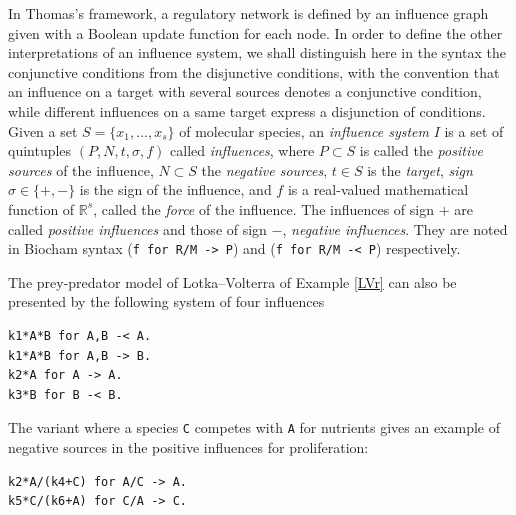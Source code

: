 \documentclass[graybox]{svmult}
\begin{document}
In Thomas's framework, a regulatory network is defined by an influence graph given with a Boolean update function for each node.
In order to define the other interpretations of an influence system, we shall distinguish here in the syntax
the conjunctive conditions from the disjunctive conditions,
with the convention that an influence on a target with several sources denotes a conjunctive condition,
while different influences on a same target express a disjunction of conditions. %
   Given a set $S = \{x_1,\dots,x_s\}$ of molecular species, an \emph{influence system}
   $I$ is a set of quintuples $(P, N, t, \sigma, f)$ called \emph{influences}, 
   where $P\subset S$ is called the \emph{positive sources} of the influence, $N\subset S$ the \emph{negative sources}, $t\in S$ is the \emph{target}, 
   \emph{sign} $\sigma\in\{+,-\}$ is the sign of the influence, and $f$ is a real-valued mathematical function
   of $\mathbb{R}^s$, called the \emph{force} of the influence.
The influences of sign $+$ are called \emph{positive influences} and those of
sign $-$, \emph{negative influences}. They are noted in Biocham syntax ({\small\verb|f for R/M -> P|}) and ({\small\verb|f for R/M -< P|}) respectively.

\begin{example}\label{LVi}
   The prey-predator model of Lotka--Volterra of Example \ref{LVr} can also be presented by the following system of four influences %
   \begin{lstlisting}
k1*A*B for A,B -< A.
k1*A*B for A,B -> B.
k2*A for A -> A.
k3*B for B -< B.
   \end{lstlisting}
   The variant where a species {\small\verb|C|} competes with {\small\verb|A|} for nutrients
   gives an example of negative sources in the positive influences for proliferation:
  \begin{lstlisting}
k2*A/(k4+C) for A/C -> A.
k5*C/(k6+A) for C/A -> C.
   \end{lstlisting}
\end{example}
\end{document}
